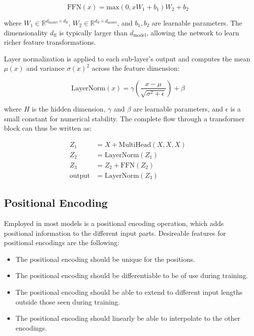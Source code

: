 \begin{equation}
\text{FFN}(x) = \text{max}(0, xW_1 + b_1)W_2 + b_2
\end{equation}

where $W_1 \in \mathbb{R}^{d_{\text{model}} \times d_{\text{ff}}}$, $W_2 \in \mathbb{R}^{d_{\text{ff}} \times d_{\text{model}}}$, and $b_1, b_2$ are learnable parameters. The dimensionality $d_{\text{ff}}$ is typically larger than $d_{\text{model}}$, allowing the network to learn richer feature transformations.

Layer normalization is applied to each sub-layer's output and computes the mean $\mu(x)$ and variance $\sigma(x)^2$ across the feature dimension:

\begin{equation}
\text{LayerNorm}(x) = \gamma \left(\frac{x - \mu}{\sqrt{\sigma^2 + \epsilon}}\right) + \beta
\end{equation}

where $H$ is the hidden dimension, $\gamma$ and $\beta$ are learnable parameters, and $\epsilon$ is a small constant for numerical stability.
The complete flow through a transformer block can thus be written as:

\begin{align}
Z_1 &= X + \text{MultiHead}(X, X, X) \\
Z_2 &= \text{LayerNorm}(Z_1) \\
Z_3 &= Z_2 + \text{FFN}(Z_2) \\
\text{output} &= \text{LayerNorm}(Z_3)
\end{align}

\subsection{Positional Encoding}

Employed in most models is a positional encoding operation, which adds positional information to the different input parts. Desireable features for positional encodings are the following:

\begin{itemize}
    \item The positional encoding should be unique for the positions.
    \item The positional encoding should be differentiable to be of use during training.
    \item The positional encoding should be able to extend to different input lengths outside those seen during training.
    \item The positional encoding should linearly be able to interpolate to the other encodings.
\end{itemize}

